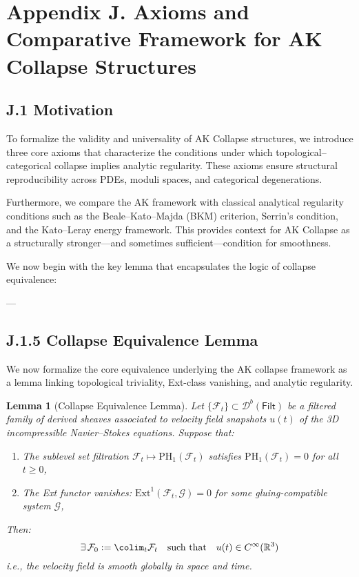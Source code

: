 \documentclass[11pt]{article}
\newtheorem{lemma}[theorem]{Lemma}
\theoremstyle{definition}
\begin{document}


\section*{Appendix J. Axioms and Comparative Framework for AK Collapse Structures}

\subsection*{J.1 Motivation}

To formalize the validity and universality of AK Collapse structures, we introduce three core axioms  
that characterize the conditions under which topological–categorical collapse implies analytic regularity.  
These axioms ensure structural reproducibility across PDEs, moduli spaces, and categorical degenerations.

Furthermore, we compare the AK framework with classical analytical regularity conditions such as the Beale--Kato--Majda (BKM) criterion, Serrin’s condition, and the Kato–Leray energy framework.  
This provides context for AK Collapse as a structurally stronger—and sometimes sufficient—condition for smoothness.

\medskip

We now begin with the key lemma that encapsulates the logic of collapse equivalence:

---

\subsection*{J.1.5 Collapse Equivalence Lemma}

We now formalize the core equivalence underlying the AK collapse framework as a lemma  
linking topological triviality, Ext-class vanishing, and analytic regularity.

\begin{lemma}[Collapse Equivalence Lemma]
\label{lem:collapse_equiv}
Let \( \{ \mathcal{F}_t \} \subset \mathcal{D}^b(\mathsf{Filt}) \) be a filtered family of derived sheaves  
associated to velocity field snapshots \( u(t) \) of the 3D incompressible Navier–Stokes equations.  
Suppose that:
\begin{enumerate}
    \item The sublevel set filtration \( \mathcal{F}_t \mapsto \mathrm{PH}_1(\mathcal{F}_t) \) satisfies \( \mathrm{PH}_1(\mathcal{F}_t) = 0 \) for all \( t \geq 0 \),
    \item The Ext functor vanishes: \( \mathrm{Ext}^1(\mathcal{F}_t, \mathcal{G}) = 0 \) for some gluing-compatible system \( \mathcal{G} \),
\end{enumerate}
Then:
\[
\exists\, \mathcal{F}_0 := \colim_t \mathcal{F}_t \quad \text{such that} \quad u(t) \in C^\infty(\mathbb{R}^3)
\]
i.e., the velocity field is smooth globally in space and time.
\end{lemma}
\end{document}
